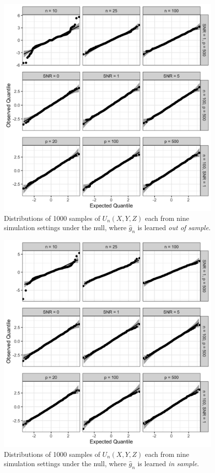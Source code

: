 \documentclass[12pt]{article}
\theoremstyle{definition}
\theoremstyle{remark}
\newcommand{\srx}{X}
\newcommand{\srz}{Z}
\newcommand{\sry}{Y}
\begin{document}
\clearpage

\begin{figure}[h!]
	\includegraphics[width = \textwidth]{out-of-sample.png}
	\caption{Distributions of 1000 samples of $U_n(\srx, \sry, \srz)$ each from nine simulation settings under the null, where $\widehat g_n$ is learned \textit{out of sample}.}
	\label{fig:out-of-sample}
\end{figure}

\clearpage

\begin{figure}[h!]
	\includegraphics[width = \textwidth]{in-sample.png}
	\caption{Distributions of 1000 samples of $U_n(\srx, \sry, \srz)$ each from nine simulation settings under the null, where $\widehat g_n$ is learned \textit{in sample}.}
	\label{fig:in-sample}
\end{figure}
\end{document}
